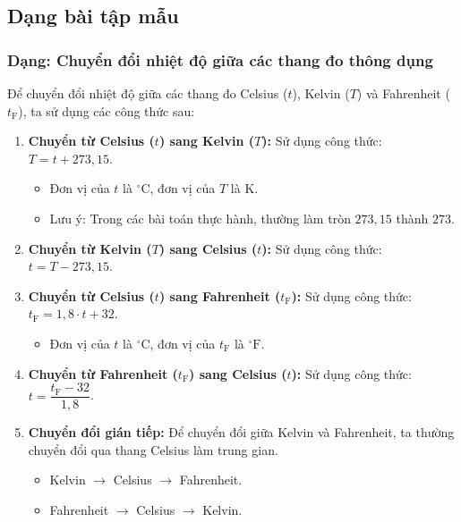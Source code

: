 


\subsection{Dạng bài tập mẫu}
\subsubsection{Dạng: Chuyển đổi nhiệt độ giữa các thang đo thông dụng}
\begin{phuongphap}
	Để chuyển đổi nhiệt độ giữa các thang đo Celsius ($t$), Kelvin ($T$) và Fahrenheit ($t_{\mathrm{F}}$), ta sử dụng các công thức sau:
	\begin{enumerate}
		\item \textbf{Chuyển từ Celsius ($t$) sang Kelvin ($T$):}
		Sử dụng công thức: $T = t + 273{,}15$.
		\begin{itemize}
			\item Đơn vị của $t$ là $^\circ\mathrm{C}$, đơn vị của $T$ là $\mathrm{K}$.
			\item Lưu ý: Trong các bài toán thực hành, thường làm tròn $273{,}15$ thành $273$.
		\end{itemize}
		\item \textbf{Chuyển từ Kelvin ($T$) sang Celsius ($t$):}
		Sử dụng công thức: $t = T - 273{,}15$.
		\item \textbf{Chuyển từ Celsius ($t$) sang Fahrenheit ($t_{\mathrm{F}}$):}
		Sử dụng công thức: $t_{\mathrm{F}} = 1{,}8 \cdot t + 32$.
		\begin{itemize}
			\item Đơn vị của $t$ là $^\circ\mathrm{C}$, đơn vị của $t_{\mathrm{F}}$ là $^\circ\mathrm{F}$.
		\end{itemize}
		\item \textbf{Chuyển từ Fahrenheit ($t_{\mathrm{F}}$) sang Celsius ($t$):}
		Sử dụng công thức: $t = \dfrac{t_{\mathrm{F}} - 32}{1{,}8}$.
		\item \textbf{Chuyển đổi gián tiếp:}
		Để chuyển đổi giữa Kelvin và Fahrenheit, ta thường chuyển đổi qua thang Celsius làm trung gian.
		\begin{itemize}
			\item Kelvin $\to$ Celsius $\to$ Fahrenheit.
			\item Fahrenheit $\to$ Celsius $\to$ Kelvin.
		\end{itemize}
	\end{enumerate}
\end{phuongphap}
